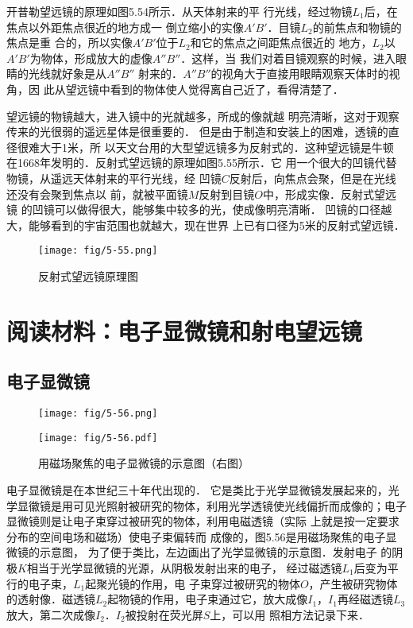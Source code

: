 开普勒望远镜的原理如图5.54所示．从天体射来的平
行光线，经过物镜$L_1$后，在焦点以外距焦点很近的地方成一
倒立缩小的实像$A'B'$．目镜$L_2$的前焦点和物镜的焦点是重
合的，所以实像$A'B'$位于$L_2$和它的焦点之间距焦点很近的
地方，$L_2$以$A'B'$为物体，形成放大的虚像$A''B''$．这样，当
我们对着目镜观察的时候，进入眼睛的光线就好象是从$A''B''$
射来的．$A''B''$的视角大于直接用眼睛观察天体时的视角，因
此从望远镜中看到的物体使人觉得离自己近了，看得清楚了．

望远镜的物镜越大，进入镜中的光就越多，所成的像就越
明亮清晰，这对于观察传来的光很弱的遥远星体是很重要的．
但是由于制造和安装上的困难，透镜的直径很难大于1米，所
以天文台用的大型望远镜多为反射式的．这种望远镜是牛顿
在1668年发明的．反射式望远镜的原理如图5.55所示．它
用一个很大的凹镜代替物镜，从遥远天体射来的平行光线，经
凹镜$C$反射后，向焦点会聚，但是在光线还没有会聚到焦点以
前，就被平面镜$M$反射到目镜$O$中，形成实像．反射式望远镜
的凹镜可以做得很大，能够集中较多的光，使成像明亮清晰．
凹镜的口径越大，能够看到的宇宙范围也就越大，现在世界
上已有口径为5米的反射式望远镜．
\begin{figure}[htp]\centering
    \texttt{[image: fig/5-55.png]}
    \caption{反射式望远镜原理图}
    \end{figure}

\section*{阅读材料：电子显微镜和射电望远镜}
\subsection*{电子显微镜}

    \begin{figure}[htp]
        \centering
        \begin{minipage}[t]{0.48\textwidth}
        \centering
        \texttt{[image: fig/5-56.png]}
        \end{minipage}
        \begin{minipage}[t]{0.48\textwidth}
        \centering
        \texttt{[image: fig/5-56.pdf]}
        \end{minipage}
        \caption{用磁场聚焦的电子显微镜的示意图（右图）}
        \end{figure}

电子显微镜是在本世纪三十年代出现的．
它是类比于光学显微镜发展起来的，光学显徽镜是用可见光照射被研究的物体，利用光学透镜使光线偏折而成像的；电子
显微镜则是让电子束穿过被研究的物体，利用电磁透镜（实际
上就是按一定要求分布的空间电场和磁场）使电子束偏转而
成像的，图5.56是用磁场聚焦的电子显微镜的示意图，
为了便于类比，左边画出了光学显微镜的示意图．发射电子
的阴极$K$相当于光学显微镜的光源，从阴极发射出来的电子，
经过磁透镜$L_1$后变为平行的电子束，$L_1$起聚光镜的作用，电
子束穿过被研究的物体$O$，产生被研究物体的透射像．磁透镜$L_2$起物镜的作用，电子束通过它，放大成像$I_1$，$I_1$再经磁透镜$L_3$放大，第二次成像$I_2$．$I_2$被投射在荧光屏$S$上，可以用
照相方法记录下来．


